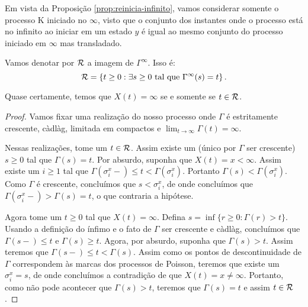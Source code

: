 Em vista da Proposição \ref{prop:reinicia-infinito}, vamos considerar
somente o processo K iniciado no $\infty$, visto que o conjunto dos
instantes onde o processo está no infinito ao iniciar em um estado $y$
é igual ao mesmo conjunto do processo iniciado em $\infty$ mas
transladado.

\begin{definicao}
  Vamos denotar por ${\mathcal{R}}$ a imagem de $\Gamma^\infty$. Isso é:
  \begin{displaymath}
    {\mathcal{R}} = \left\{
      t \geq 0 : \exists s \geq 0 \textrm{ tal que } \Gamma^\infty(s) = t
    \right\}.
  \end{displaymath}
\end{definicao}

\begin{proposicao}
  Quase certamente, temos que $X(t) = \infty$ se e somente se $t \in {\mathcal{R}}$.
\end{proposicao}
\begin{proof}
  Vamos fixar uma realização do nosso processo onde $\Gamma$ é
  estritamente crescente, càdlàg, limitada em compactos e $\lim_{t \to
    \infty} \Gamma(t) = \infty$.

  Nessas realizações, tome um $t \in {\mathcal{R}}$. Assim existe um (único por
  $\Gamma$ ser crescente) $s \geq 0$ tal que $\Gamma(s) = t$. Por
  absurdo, suponha que $X(t) = x < \infty$. Assim existe um $i \geq 1$
  tal que $\Gamma(\sigma_i^x -) \leq t < \Gamma(\sigma_i^x)$. Portanto
  $\Gamma(s) < \Gamma(\sigma_i^x)$. Como $\Gamma$ é crescente,
  concluímos que $s < \sigma_i^x$, de onde concluímos que
  $\Gamma(\sigma_i^x-) > \Gamma(s) = t$, o que contraria a hipótese.

  Agora tome um $t \geq 0$ tal que $X(t) = \infty$. Defina $s = \inf
  \{ r \geq 0 :  \Gamma(r) > t \}$. Usando a definição do ínfimo e o
  fato de $\Gamma$ ser crescente e càdlàg, concluímos que $\Gamma(s-)
  \leq t$ e $\Gamma(s) \geq t$. Agora, por absurdo, suponha que
  $\Gamma(s) > t$. Assim teremos que $\Gamma(s-) \leq t <
  \Gamma(s)$. Assim como os pontos de descontinuidade de $\Gamma$
  correspondem às marcas dos processos de Poisson, teremos que existe
  um $\sigma_i^x = s$, de onde concluímos a contradição de que $X(t) =
  x \neq \infty$. Portanto, como não pode acontecer que $\Gamma(s) >
  t$, teremos que $\Gamma(s) = t$ e assim $t \in {\mathcal{R}}$.
\end{proof}

